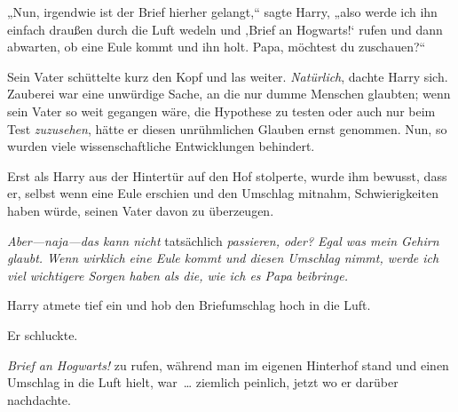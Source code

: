 „Nun, irgendwie ist der Brief hierher gelangt,“ sagte Harry, „also werde ich ihn einfach draußen durch die Luft wedeln und ‚Brief an Hogwarts!‘ rufen und dann abwarten, ob eine Eule kommt und ihn holt. Papa, möchtest du zuschauen?“

Sein Vater schüttelte kurz den Kopf und las weiter. \emph{Natürlich}, dachte Harry sich. Zauberei war eine unwürdige Sache, an die nur dumme Menschen glaubten; wenn sein Vater so weit gegangen wäre, die Hypothese zu testen oder auch nur beim Test \emph{zuzusehen}, hätte er diesen unrühmlichen Glauben ernst genommen. Nun, so wurden viele wissenschaftliche Entwicklungen behindert.

Erst als Harry aus der Hintertür auf den Hof stolperte, wurde ihm bewusst, dass er, selbst wenn eine Eule erschien und den Umschlag mitnahm, Schwierigkeiten haben würde, seinen Vater davon zu überzeugen.

\emph{Aber—naja—das kann nicht} tatsächlich \emph{passieren, oder? Egal was mein Gehirn glaubt. Wenn wirklich eine Eule kommt und diesen Umschlag nimmt, werde ich viel wichtigere Sorgen haben als die, wie ich es Papa beibringe.}

Harry atmete tief ein und hob den Briefumschlag hoch in die Luft.

Er schluckte.

\emph{Brief an Hogwarts!} zu rufen, während man im eigenen Hinterhof stand und einen Umschlag in die Luft hielt, war … ziemlich peinlich, jetzt wo er darüber nachdachte.

